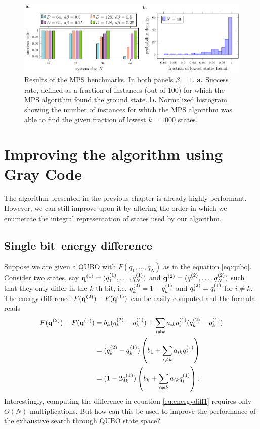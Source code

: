 \begin{figure}[th]
  \includegraphics[width=\textwidth]{figures/mps_benchmark}
  \caption{Results of the MPS benchmarks. In both panels $\beta=1$. \textbf{a.} Success
    rate, defined as a fraction of instances (out of 100) for which the MPS
    algorithm found the ground state. \textbf{b.} Normalized histogram showing the
    number of instances for which the MPS algorithm was able to find the given
    fraction of lowest $k=1000$ states.} \label{fig:mpsbench}
\end{figure}

\section{Improving the algorithm using Gray Code}

The algorithm presented in the previous chapter is already highly performant. However, we can still improve
upon it by altering the order in which we enumerate the integral representation
of states used by our algorithm.

\subsection{Single bit--energy difference}
Suppose we are given a QUBO with $F(q_{1},\ldots,q_{N})$ as in the equation
\eqref{eq:qubo}. Consider two states, say $\mathbf{q}^{(1)} = (q^{(1)}_{1},\ldots,q^{(1)}_{N})$
and $\mathbf{q}^{(2)}=(q^{(2)}_{1},\ldots,q^{(2)}_{N})$ such that they only differ in the
$k$-th bit, i.e. $q^{(2)}_{k}=1-q^{(1)}_{k}$ and $q^{(2)}_{i}=q^{(1)}_{i}$ for $i \ne
  k$. The energy difference $F(\mathbf{q}^{(2)})-F(\mathbf{q}^{(1)})$ can be easily computed and the
formula reads
\begin{align}
  \begin{split}
    \label{eq:energydiff1}
    F(\mathbf{q}^{(2)})-F(\mathbf{q}^{(1)}) &= b_{k}(q^{(2)}_{k}-q^{(1)}_{k}) + \sum_{i\ne k}a_{ik}q^{(1)}_{i}(q^{(2)}_{k} - q^{(1)}_{k}) \\
    &= (q^{(2)}_{k}-q^{(1)}_{k}) \left(b_{1} + \sum_{i \ne k}a_{ik}q^{(1)}_{i}\right) \\
    & = (1-2q^{(1)}_{k}) \left(b_{k} + \sum_{i \ne k}a_{ik}q^{(1)}_{i}\right).
  \end{split}
\end{align}
Interestingly, computing the difference in equation \eqref{eq:energydiff1}
requires only $O(N)$ multiplications. But how can this be used to improve the
performance of the exhaustive search through QUBO state space?

